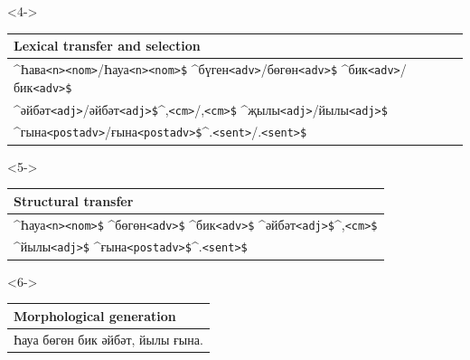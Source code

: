\documentclass[10pt,xetex]{beamer} %
\newcommand{\atag}[1]{{\scriptsize{\texttt{#1}}}}
\begin{document}
\begin{frame}[fragile]
\begin{onlyenv}<4->
\fontsize{9pt}{11.2}\selectfont
  \begin{tabular*}{\textwidth}{l}
  {\bf Lexical transfer and selection} \\
  \hline
   \^{}Һава\atag{<n>}\atag{<nom>}/Һауа\atag{<n>}\atag{<nom>\$} \^{}бүген\atag{<adv>}/бөгөн\atag{<adv>\$} \^{}бик\atag{<adv>}/бик\atag{<adv>\$} \\
                \^{}әйбәт\atag{<adj>}/әйбәт\atag{<adj>\$}\^{},\atag{<cm>}/,\atag{<cm>\$} \^{}җылы\atag{<adj>}/йылы\atag{<adj>\$} \\ 
                \^{}гына\atag{<postadv>}/ғына\atag{<postadv>\$}\^{}.\atag{<sent>}/.\atag{<sent>\$}\\
  \hline
  \end{tabular*}
\end{onlyenv}

\begin{onlyenv}<5->
\fontsize{9pt}{11.2}\selectfont
  \begin{tabular*}{\textwidth}{l}
  {\bf Structural transfer} \\
  \hline
   \^{}Һауа\atag{<n>}\atag{<nom>\$} \^{}бөгөн\atag{<adv>\$} \^{}бик\atag{<adv>\$} \^{}әйбәт\atag{<adj>\$}\^{},\atag{<cm>\$} \\ 
                \^{}йылы\atag{<adj>\$} \^{}ғына\atag{<postadv>\$}\^{}.\atag{<sent>\$}\\
  \hline
  \end{tabular*}
\end{onlyenv}

\begin{onlyenv}<6->
\fontsize{9pt}{11.2}\selectfont
  \begin{tabular*}{\textwidth}{l}
  {\bf Morphological generation}\\
  \hline
   Һауа бөгөн бик әйбәт, йылы ғына. \\
  \hline
  \end{tabular*}
\end{onlyenv}

\end{frame}
\end{document}
